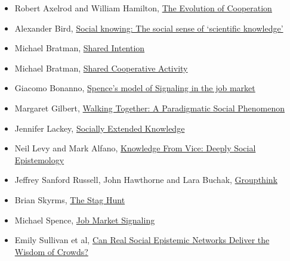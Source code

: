 \documentclass[
]{article}
\providecommand{\tightlist}{%
  \setlength{\itemsep}{0pt}\setlength{\parskip}{0pt}}
\begin{document}
\begin{itemize}
\tightlist
\item
  Robert Axelrod and William Hamilton,
  \href{http://www-personal.umich.edu/~axe/research/Axelrod\%20and\%20Hamilton\%20EC\%201981.pdf}{The
  Evolution of Cooperation}
\item
  Alexander Bird, \href{https://philpapers.org/rec/BIRSKT}{Social
  knowing: The social sense of `scientific knowledge'}
\item
  Michael Bratman, \href{https://philpapers.org/rec/BRASI}{Shared
  Intention}
\item
  Michael Bratman, \href{https://philpapers.org/rec/BRASCA}{Shared
  Cooperative Activity}
\item
  Giacomo Bonanno, \href{http://canvas.umich.edu/}{Spence's model of
  Signaling in the job market}
\item
  Margaret Gilbert, \href{https://philpapers.org/rec/GILWTA}{Walking
  Together: A Paradigmatic Social Phenomenon}
\item
  Jennifer Lackey, \href{https://philpapers.org/rec/LACSEK}{Socially
  Extended Knowledge}
\item
  Neil Levy and Mark Alfano,
  \href{https://philpapers.org/rec/LEVKFV}{Knowledge From Vice: Deeply
  Social Epistemology}
\item
  Jeffrey Sanford Russell, John Hawthorne and Lara Buchak,
  \href{https://philpapers.org/rec/RUSG}{Groupthink}
\item
  Brian Skyrms, \href{https://www.jstor.org/stable/3218711}{The Stag
  Hunt}
\item
  Michael Spence, \href{https://www.jstor.org/stable/1882010?seq=1}{Job
  Market Signaling}
\item
  Emily Sullivan et al,
  \href{https://philarchive.org/archive/SULCRS}{Can Real Social
  Epistemic Networks Deliver the Wisdom of Crowds?}
\end{itemize}
\end{document}
